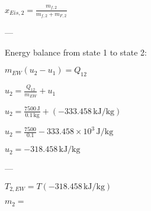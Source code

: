 \( x_{Eis,2} = \frac{m_{f,2}}{m_{f,2} + m_{F,2}} \)

---

Energy balance from state 1 to state 2:

\( m_{EW} (u_2 - u_1) = Q_{12} \)

\( u_2 = \frac{Q_{12}}{m_{EW}} + u_1 \)

\( u_2 = \frac{7500 \, \text{J}}{0.1 \, \text{kg}} + (-333.458 \, \text{kJ/kg}) \)

\( u_2 = \frac{7500}{0.1} - 333.458 \times 10^3 \, \text{J/kg} \)

\( u_2 = -318.458 \, \text{kJ/kg} \)

---

\( T_{2,EW} = T(-318.458 \, \text{kJ/kg}) \)

\( m_2 = \)